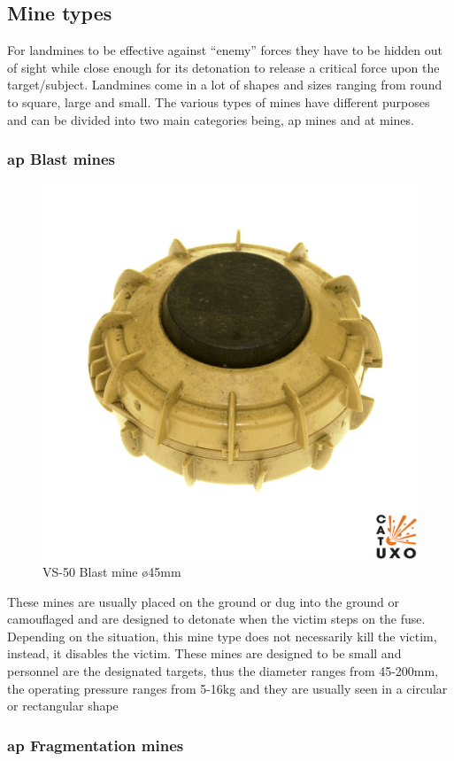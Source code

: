 \subsection{Mine types}\label{mine_types}
For landmines to be effective against “enemy” forces they have to be hidden out of sight while close enough for its detonation to release a critical force upon the target/subject. Landmines come in a lot of shapes and sizes ranging from round to square, large and small. The various types of mines have different purposes and can be divided into two main categories being, \gls{ap} mines and \gls{at} mines.


\subsubsection*{\gls{ap} Blast mines} 

\begin{figure}
\vspace{-8mm}
\centering
\includegraphics[width=0.5\linewidth]{00 - Images/vs-50-001.jpg}
  \caption{VS-50 Blast mine ø45mm \cite{vs-50}}
  \label{fig:vs-50}
\end{figure}

These mines are usually placed on the ground or dug into the ground or camouflaged and are designed to detonate when the victim steps on the fuse. Depending on the situation, this mine type does not necessarily kill the victim, instead, it disables the victim. These mines are designed to be small and personnel are the designated targets, thus the diameter ranges from 45-200mm, the operating pressure ranges from 5-16kg and they are usually seen in a circular or rectangular shape \cite{mine_detection}\cite{landmines_and_mine_action}

\newpage

\subsubsection*{\gls{ap} Fragmentation mines}

